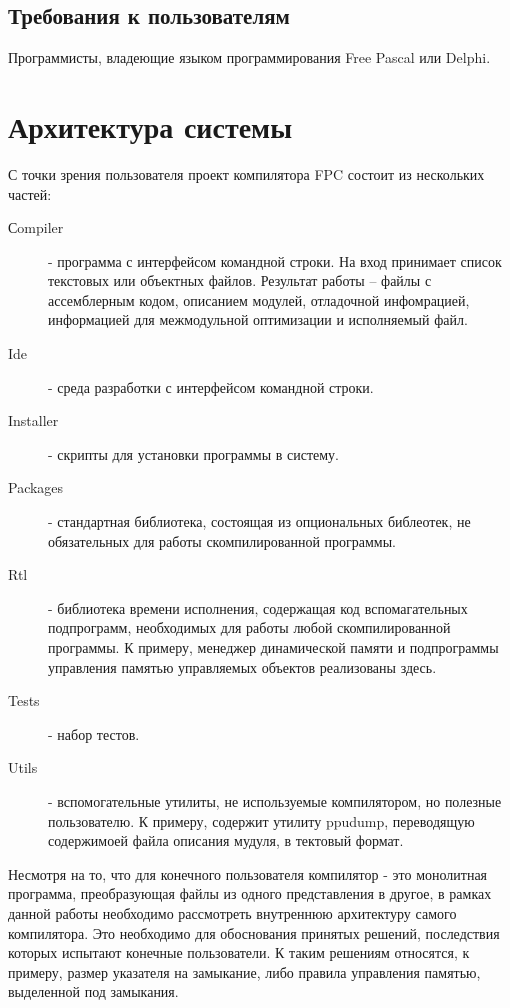 \documentclass{imcs}
\begin{document}
\subsection{Требования к пользователям}
Программисты, владеющие языком программирования Free Pascal или Delphi.

\section{Архитектура системы}

С точки зрения пользователя проект компилятора FPC состоит из нескольких 
частей:
\begin{description}
    \item[Сompiler] - программа с интерфейсом командной строки. На вход
принимает список текстовых или объектных файлов. Результат работы --
файлы с ассемблерным кодом, описанием модулей, отладочной инфомрацией,
информацией для межмодульной оптимизации и исполняемый файл.
    \item[Ide] - среда разработки с интерфейсом командной строки.
    \item[Installer] - скрипты для установки программы в систему.
    \item[Packages] - стандартная библиотека, состоящая из опциональных
библеотек, не обязательных для работы скомпилированной программы.
    \item[Rtl] - библиотека времени исполнения, содержащая код вспомагательных
подпрограмм, необходимых для работы любой скомпилированной программы. К 
примеру, менеджер динамической памяти и подпрограммы управления памятью
управляемых объектов реализованы здесь.
    \item[Tests] - набор тестов.
    \item[Utils] - вспомогательные утилиты, не используемые компилятором,
но полезные пользователю. К примеру, содержит утилиту ppudump, переводящую
содержимоей файла описания мудуля, в тектовый формат.
\end{description}

Несмотря на то, что для конечного пользователя компилятор - это монолитная
программа, преобразующая файлы из одного представления в другое, в рамках
данной работы необходимо рассмотреть внутреннюю архитектуру самого компилятора.
Это необходимо для обоснования принятых решений, последствия которых 
испытают конечные пользователи. К таким решениям относятся, к примеру,
размер указателя на замыкание, либо правила управления памятью,
выделенной под замыкания.
\end{document}
